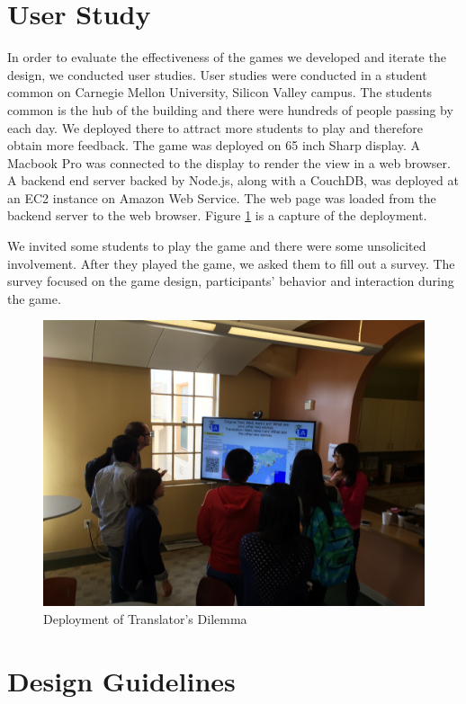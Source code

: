 \documentclass{sig-alternate}
\begin{document}
\section{User Study}
In order to evaluate the effectiveness of the games we developed and iterate the design, we conducted user studies. User studies were conducted in a student common on Carnegie Mellon University, Silicon Valley campus. The students common is the hub of the building and there were hundreds of people passing by each day. We deployed there to attract more students to play and therefore obtain more feedback. The game was deployed on 65 inch Sharp display. A Macbook Pro was connected to the display to render the view in a web browser. A backend end server backed by Node.js, along with a CouchDB, was deployed at an EC2 instance on Amazon Web Service. The web page was loaded from the backend server to the web browser. Figure \ref{us:deployment} is a capture of the deployment. 

We invited some students to play the game and there were some unsolicited involvement. After they played the game, we asked them to fill out a survey. The survey focused on the game design, participants' behavior and interaction during the game.

\begin{figure}
	\includegraphics[width=\linewidth]{deploy.jpg}
	\caption{Deployment of Translator's Dilemma}
	\label{us:deployment}
\end{figure}

\section{Design Guidelines}
\end{document}
